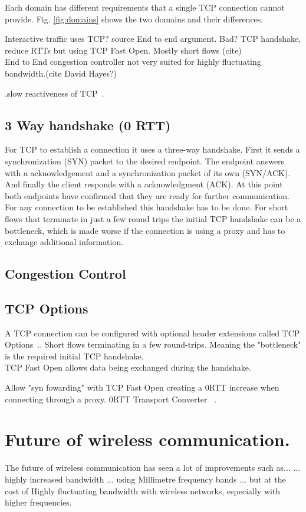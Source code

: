 \documentclass[a4paper,english, 11pt]{report}
\begin{document}
Each domain has different requirements that a single TCP connection cannot provide. Fig. \ref{fig:domains} shows the two domains and their differences.

Interactive traffic uses TCP? {source}
End to end argument. Bad?
TCP handshake, reduce RTTs but using TCP Fast Open. Mostly short flows (cite)
\\
End to End congestion controller not very suited for highly fluctuating bandwidth.(cite David Hayes?)

.slow reactiveness of TCP~\cite{tcp_mmwave_proxy}.

\subsection{3 Way handshake (0 RTT)}
For TCP to establish a connection it uses a three-way handshake. First it sends a synchronization (SYN) packet to the desired endpoint. The endpoint answers with a acknowledgement and a synchronization packet of its own (SYN/ACK). And finally the client responds with a acknowledgment (ACK). At this point both endpoints have confirmed that they are ready for further communication. For any connection to be established this handshake has to be done. For short flows that terminate in just a few round trips the initial TCP handshake can be a bottleneck, which is made worse if the connection is using a proxy and has to exchange additional information. 

\subsection{Congestion Control}

\subsection{TCP Options}
A TCP connection can be configured with optional header extensions called TCP Options~\cite{tcp_options}.. 
Short flows terminating in a few round-trips. Meaning the "bottleneck" is the required initial TCP handshake.\\
TCP Fast Open allows data being exchanged during the handshake. 

Allow "syn fowarding" with TCP Fast Open creating a 0RTT increase when connecting through a proxy.
0RTT Transport Converter ~\cite{rfc8803}.


\section{Future of wireless communication.}
The future of wireless communication has seen a lot of improvements such as...
... highly increased bandwidth ... using Millimetre frequency bands ... but at the cost of Highly fluctuating bandwidth with wireless networks, especially with higher frequencies.\\ 
\end{document}
